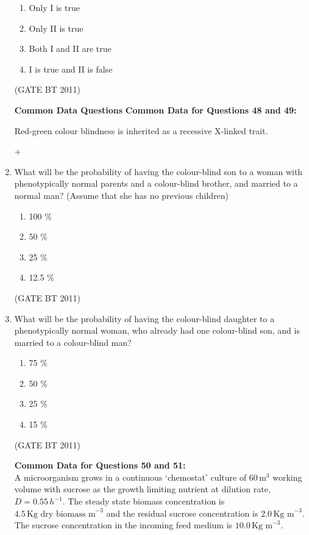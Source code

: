 \documentclass[journal,12pt,onecolumn]{IEEEtran}
\begin{document}
\begin{enumerate}
  \begin{multicols}{2}
    \begin{enumerate}
      \item Only I is true
      \item Only II is true
      \item Both I and II are true
      \item I is true and II is false
    \end{enumerate}
  \end{multicols} \hfill(GATE BT 2011)

\textbf{Common Data Questions}
 \textbf{Common Data for Questions 48 and 49:}

Red-green colour blindness is inherited as a recessive X-linked trait.

  +%
\item What will be the probability of having the colour-blind son to a woman with phenotypically normal parents and a colour-blind brother, and married to a normal man? (Assume that she has no previous children)
  \begin{multicols}{4}
    \begin{enumerate}
      \item 100 \%
      \item 50 \%
      \item 25 \%
      \item 12.5 \%
    \end{enumerate}
    \end{multicols}  \hfill(GATE BT 2011)


  \item What will be the probability of having the colour-blind daughter to a phenotypically normal woman, who already had one colour-blind son, and is married to a colour-blind man?

   \begin{multicols}{4}   
    \begin{enumerate}
      \item 75 \%
      \item 50 \%
      \item 25 \%
      \item 15 \%
    \end{enumerate}
  \end{multicols} \hfill(GATE BT 2011)

\textbf{Common Data for Questions 50 and 51:} \\
A microorganism grows in a continuous `chemostat' culture of $60 \, \text{m}^3$ working volume with sucrose as the growth limiting nutrient at dilution rate, $D = 0.55 \, h^{-1}$. The steady state biomass concentration is $4.5 \, \text{Kg dry biomass m}^{-3}$ and the residual sucrose concentration is $2.0 \, \text{Kg m}^{-3}$. The sucrose concentration in the incoming feed medium is $10.0 \, \text{Kg m}^{-3}$.


\end{enumerate}
\end{document}

